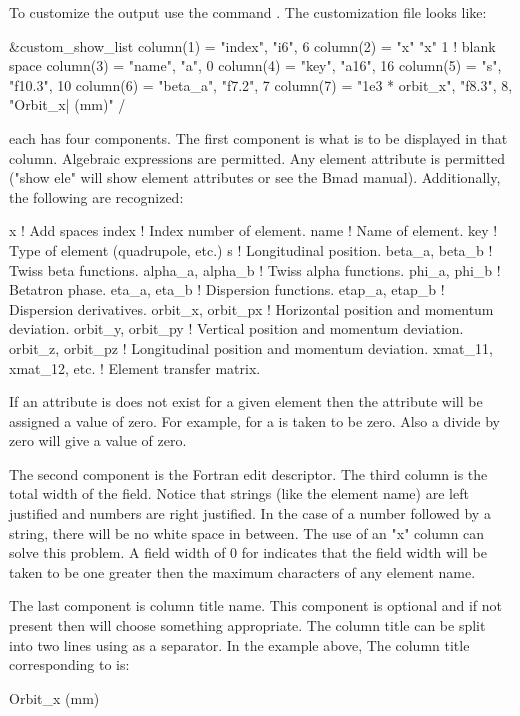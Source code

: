 {\begin{description}
To customize the output use the command . The customization file looks like:
\begin{example}
  &custom_show_list
    column(1) = "index",   "i6",     6 
    column(2) = "x"        "x"       1       ! blank space
    column(3) = "name",    "a",      0
    column(4) = "key",     "a16",   16
    column(5) = "s",       "f10.3", 10
    column(6) = "beta_a",  "f7.2",   7
    column(7) = "1e3 * orbit_x", "f8.3", 8, "Orbit_x| (mm)" 
  /
\end{example}
each  has four components. The first component is what
is to be displayed in that column. Algebraic expressions are
permitted. Any element attribute is permitted ("show ele" will show
element attributes or see the Bmad manual). Additionally, the following
are recognized:
\begin{example}
  x                      ! Add spaces
  index                  ! Index number of element.
  name                   ! Name of element.
  key                    ! Type of element (quadrupole, etc.)
  s                      ! Longitudinal position.
  beta_a,  beta_b        ! Twiss beta functions.
  alpha_a, alpha_b       ! Twiss alpha functions.
  phi_a,   phi_b         ! Betatron phase.
  eta_a,   eta_b         ! Dispersion functions.
  etap_a,  etap_b        ! Dispersion derivatives.
  orbit_x, orbit_px      ! Horizontal position and momentum deviation.
  orbit_y, orbit_py      ! Vertical position and momentum deviation.
  orbit_z, orbit_pz      ! Longitudinal position and momentum deviation.
  xmat_11, xmat_12, etc. ! Element transfer matrix.
\end{example}
If an attribute is does not exist for a given element then the
attribute will be assigned a value of zero. For example, 
for a  is taken to be zero. Also a divide by zero will
give a value of zero.

The second component is the Fortran edit descriptor. The third column
is the total width of the field. Notice that strings (like the element
name) are left justified and numbers are right justified. In the case
of a number followed by a string, there will be no white space in
between. The use of an "x" column can solve this problem. A field width
of 0 for  indicates that the field width will be taken to be
one greater then the maximum characters of any element name.

The last component is column title name. This component is optional
and if not present then \tao will choose something appropriate. The
column title can be split into two lines using  as a separator.
In the example above, The column title corresponding to  
is:
\begin{example}
  Orbit_x
   (mm)
\end{example}


\end{description}}
